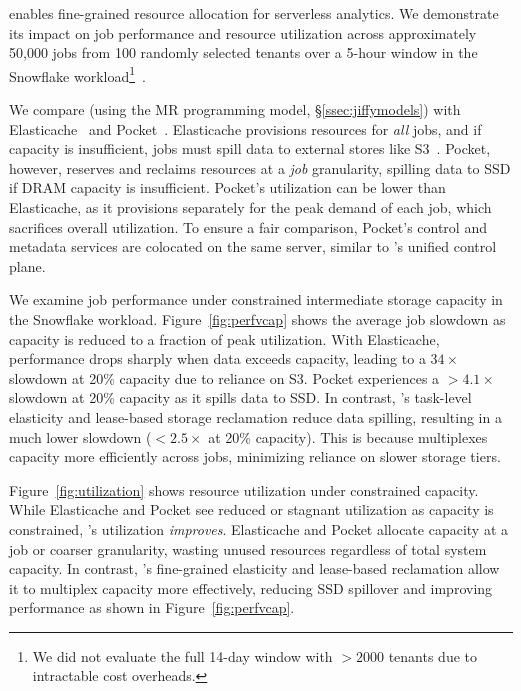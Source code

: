 \jiffy enables fine-grained resource allocation for serverless analytics. We demonstrate its impact on job performance and resource utilization across approximately 50,000 jobs from 100 randomly selected tenants over a 5-hour window in the Snowflake workload\footnote{We did not evaluate the full 14-day window with $>2000$ tenants due to intractable cost overheads.}~\cite{snowset}.

We compare \jiffy (using the MR programming model, \S\ref{ssec:jiffymodels}) with Elasticache~\cite{elasticache} and Pocket~\cite{pocket}. Elasticache provisions resources for \textit{all} jobs, and if capacity is insufficient, jobs must spill data to external stores like S3~\cite{s3}. Pocket, however, reserves and reclaims resources at a \textit{job} granularity, spilling data to SSD if DRAM capacity is insufficient. Pocket’s utilization can be lower than Elasticache, as it provisions separately for the peak demand of each job, which sacrifices overall utilization. To ensure a fair comparison, Pocket’s control and metadata services are colocated on the same server, similar to \jiffy’s unified control plane.

 We examine job performance under constrained intermediate storage capacity in the Snowflake workload. Figure~\ref{fig:perfvcap} shows the average job slowdown as capacity is reduced to a fraction of peak utilization. With Elasticache, performance drops sharply when data exceeds capacity, leading to a $34\times$ slowdown at 20\% capacity due to reliance on S3. Pocket experiences a $>4.1\times$ slowdown at 20\% capacity as it spills data to SSD. In contrast, \jiffy’s task-level elasticity and lease-based storage reclamation reduce data spilling, resulting in a much lower slowdown ($<2.5\times$ at 20\% capacity). This is because \jiffy multiplexes capacity more efficiently across jobs, minimizing reliance on slower storage tiers.

 Figure~\ref{fig:utilization} shows resource utilization under constrained capacity. While Elasticache and Pocket see reduced or stagnant utilization as capacity is constrained, \jiffy’s utilization \textit{improves}. Elasticache and Pocket allocate capacity at a job or coarser granularity, wasting unused resources regardless of total system capacity. In contrast, \jiffy’s fine-grained elasticity and lease-based reclamation allow it to multiplex capacity more effectively, reducing SSD spillover and improving performance as shown in Figure~\ref{fig:perfvcap}.


